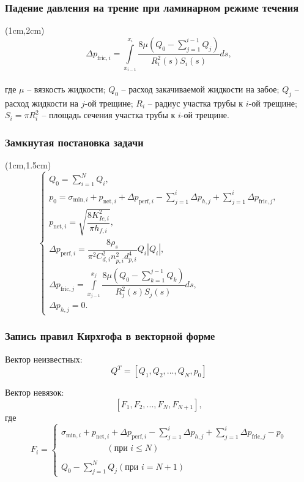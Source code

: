 \documentclass{beamer}
\begin{document}
\begin{frame}
\frametitle{Падение давления на трение при ламинарном режиме течения}
\begin{textblock*}{11cm}(1cm,2cm)
$$
\Delta p_{\text{fric}, i}=\int\limits_{x_{i-1}}^{x_i}{\frac{8\mu\left(Q_0-\sum\limits_{j=1}^{i-1}{Q_j}\right)}{R_i^2(s)S_i(s)}}ds,
$$\\
где $\mu$ -- вязкость жидкости;\newline
$Q_0$ -- расход закачиваемой жидкости на забое;\newline
$Q_j$ -- расход жидкости на $j$-ой трещине;\newline
$R_i$ -- радиус участка трубы к $i$-ой трещине;\newline
$S_i=\pi R_i^2$ -- площадь сечения участка трубы к $i$-ой трещине.
\end{textblock*}
\normalsize
\end{frame}


\begin{frame}
\frametitle{Замкнутая постановка задачи}
\small
\begin{textblock*}{11cm}(1cm,1.5cm)
$$
\begin{cases}
	\displaystyle Q_0=\sum\limits_{i=1}^{N}Q_i,\\
	\displaystyle p_0=\sigma_{\text{min},i}+p_{\text{net},i}+\Delta p_{\text{perf},i}-\sum_{j=1}^{i}{\Delta p_{h,j}}+\sum_{j=1}^{i}\Delta p_{\text{fric},j},\\[10pt]
	\displaystyle p_{\text{net},i}=\sqrt{\dfrac{8K_{Ic,i}^2}{\pi h_{f,i}}},\\[15pt]
	\displaystyle \Delta p_{\text{perf},i}=\dfrac{8\rho_s}{\pi^2 C_{d,i}^2 n_{p,i}^2 d_{p,i}^4}Q_i\left|Q_i\right|,\\[15pt]
	\displaystyle \Delta p_{\text{fric}, j}=\int\limits_{x_{j-1}}^{x_j}{\dfrac{8\mu\left(Q_0-\sum\limits_{k=1}^{j-1}{Q_k}\right)}{R_j^2(s)S_j(s)}}ds,\\[20pt]
	\displaystyle \Delta p_{h,j}=0.
\end{cases}
$$
\end{textblock*}
\normalsize
\end{frame}


\begin{frame}
\frametitle{Запись правил Кирхгофа в векторной форме}

Вектор неизвестных:
$$Q^T=\left[Q_1,Q_2,...,Q_N,p_0\right]$$

Вектор невязок:
$$\left[F_1,F_2,...,F_N,F_{N+1}\right],$$
где
$$
F_i=
\begin{cases}
\sigma_{\text{min},i}+p_{\text{net},i}+\Delta p_{\text{perf},i}-\sum\limits_{j=1}^{i}{\Delta p_{h,j}}+\sum\limits_{j=1}^{i}{\Delta p_{\text{fric},j}}-p_0\\\,\,\,\,\,\,\,\,\,\,\,\,\,\,\,\,\,\,\,\,\,\,\,\,\,\,\,\,\,\,\,\,\left(\text{при }i\leqslant N\right)\\\ \\
Q_0-\sum\limits_{j=1}^{N}{Q_j}\left(\text{при }i=N+1\right)
\end{cases}
$$

\end{frame}
\end{document}
